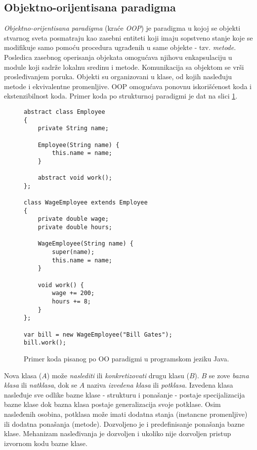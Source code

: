 \subsection{Objektno-orijentisana paradigma}
\label{subsec:ParadigmOOP}

\emph{Objektno-orijentisana paradigma} (kraće \emph{OOP}) je paradigma u kojoj se objekti stvarnog sveta posmatraju kao zasebni entiteti koji imaju sopstveno stanje koje se modifikuje samo pomoću procedura ugrađenih u same objekte - tzv. \emph{metode}. Posledica zasebnog operisanja objekata omogućava njihovu enkapsulaciju u module koji sadrže lokalnu sredinu i metode. Komunikacija sa objektom se vrši prosleđivanjem poruka. Objekti su organizovani u klase, od kojih nasleđuju metode i ekvivalentne promenljive. OOP omogućava ponovnu iskorišćenost koda i ekstenzibilnost koda. Primer koda po strukturnoj paradigmi je dat na slici \ref{fig:ParadigmOOP}. 

\begin{figure}[h!]
\begin{lstlisting}
abstract class Employee
{
    private String name;

    Employee(String name) {
        this.name = name;
    }

    abstract void work();
};

class WageEmployee extends Employee
{
    private double wage;
    private double hours;

    WageEmployee(String name) {
        super(name);
        this.name = name;
    }

    void work() {
        wage += 200;
        hours += 8;
    }
};

var bill = new WageEmployee("Bill Gates");
bill.work();
\end{lstlisting}
\caption{Primer koda pisanog po OO paradigmi u programskom jeziku Java.}
\label{fig:ParadigmOOP}
\end{figure}

Nova klasa ($A$) može \emph{naslediti} ili \emph{konkretizovati} drugu klasu ($B$). $B$ se zove \emph{bazna klasa} ili \emph{natklasa}, dok se $A$ naziva \emph{izvedena klasa} ili \emph{potklasa}. Izvedena klasa nasleđuje sve odlike bazne klase - strukturu i ponašanje - postaje specijalizacija bazne klase dok bazna klasa postaje generalizacija svoje potklase. Osim nasleđenih osobina, potklasa može imati dodatna stanja (instancne promenljive) ili dodatna ponašanja (metode). Dozvoljeno je i predefinisanje ponašanja bazne klase. Mehanizam nasleđivanja je dozvoljen i ukoliko nije dozvoljen pristup izvornom kodu bazne klase.

